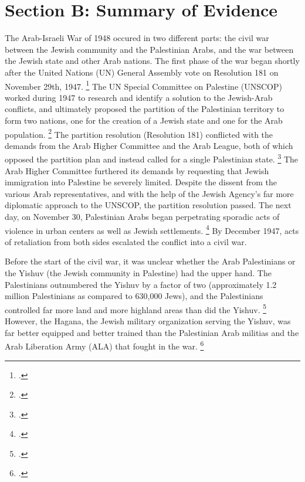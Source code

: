 \documentclass[11pt]{turabian-researchpaper}
\begin{document}
\section{Section B: Summary of Evidence}
The Arab-Israeli War of 1948 occured in two different parts: the civil war between the Jewish community and the Palestinian Arabs, and the war between the Jewish state and other Arab nations.  The first phase of the war began shortly after the United Nations (UN) General Assembly vote on Resolution 181 on November 29th, 1947.
\footcite[][]{tal}
The UN Special Committee on Palestine (UNSCOP) worked during 1947 to research and identify a solution to the Jewish-Arab conflicts, and ultimately proposed the partition of the Palestinian territory to form two nations, one for the creation of a Jewish state and one for the Arab population.
\footcite[][22]{pappe}
The partition resolution (Resolution 181) conflicted with the demands from the Arab Higher Committee and the Arab League, both of which opposed the partition plan and instead called for a single Palestinian state.
\footcite[][23]{pappe}
The Arab Higher Committee furthered its demands by requesting that Jewish immigration into Palestine be severely limited.  Despite the dissent from the various Arab representatives, and with the help of the Jewish Agency's far more diplomatic approach to the UNSCOP, the partition resolution passed.  The next day, on November 30, Palestinian Arabs began perpetrating sporadic acts of violence in urban centers as well as Jewish settlements.
\footcite[][77]{morris}
By December 1947, acts of retaliation from both sides escalated the conflict into a civil war.



Before the start of the civil war, it was unclear whether the Arab Palestinians or the Yishuv (the Jewish community in Palestine) had the upper hand.  The Palestinians outnumbered the Yishuv by a factor of two (approximately 1.2 million Palestinians as compared to 630,000 Jews), and the Palestinians controlled far more land and more highland areas than did the Yishuv.
\footcite[][30]{bartal}
However, the Hagana, the Jewish military organization serving the Yishuv, was far better equipped and better trained than the Palestinian Arab militias and the Arab Liberation Army (ALA) that fought in the war.
\footcite[][81]{morris}
\end{document}
